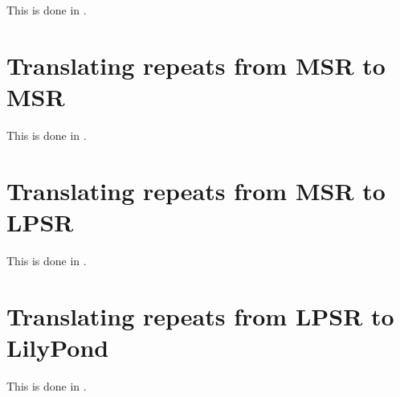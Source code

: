 This is done in \mxsrToMsr{}.


\section{Translating repeats from MSR to MSR}

This is done in \msrToMsr{}.


\section{Translating repeats from MSR to LPSR}

This is done in \msrToLpsr{}.


\section{Translating repeats from LPSR to LilyPond}

This is done in \lpsrToLilypond{}.


